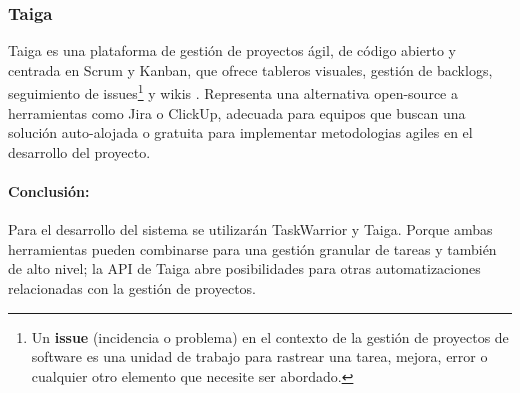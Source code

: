 \subsubsection{Taiga}
Taiga es una plataforma de gestión de proyectos ágil, de código abierto y centrada en Scrum y Kanban, que ofrece tableros visuales, gestión de backlogs, seguimiento de issues\footnote{Un \textbf{issue} (incidencia o problema) en el contexto de la gestión de proyectos de software es una unidad de trabajo para rastrear una tarea, mejora, error o cualquier otro elemento que necesite ser abordado.} y wikis \parencite{Taiga}.
Representa una alternativa open-source a herramientas como Jira o ClickUp, adecuada para equipos que buscan una solución auto-alojada o gratuita para implementar metodologias agiles en el desarrollo del proyecto.

\paragraph{Conclusión:}
Para el desarrollo del sistema se utilizarán TaskWarrior y Taiga.
Porque ambas herramientas pueden combinarse para una gestión granular de tareas y también de alto nivel;
la API de Taiga abre posibilidades para otras automatizaciones relacionadas con la gestión de proyectos.
